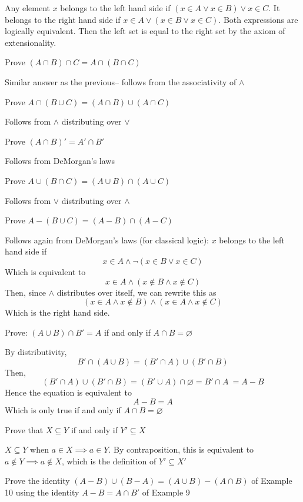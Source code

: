 \answer 
Any element $x$ belongs to the left hand side if $(x \in A \vee x \in B) \vee x \in C$. It belongs to the right hand side if $x \in A \vee (x \in B \vee x \in C)$. Both expressions are logically equivalent. Then the left set is equal to the right set by the axiom of extensionality.


\exercise
Prove $(A \cap B) \cap C = A \cap (B \cap C)$

\answer 
Similar answer as the previous-- follows from the associativity of $\wedge$


\exercise
Prove $A \cap (B \cup C) = (A \cap B) \cup (A \cap C)$

\answer
Follows from $\wedge$ distributing over $\vee$


\exercise
Prove $(A \cap B)' = A' \cap B'$

\answer
Follows from DeMorgan's laws


\exercise
Prove $A \cup (B \cap C) = (A \cup B) \cap (A \cup C)$

\answer
Follows from $\vee$ distributing over $\wedge$


\exercise
Prove $A - (B \cup C) = (A - B) \cap (A - C)$

\answer
Follows again from DeMorgan's laws (for classical logic): $x$ belongs to the left hand side if
\[x \in A \wedge \neg(x \in B \vee x \in C)\] 
Which is equivalent to 
\[x \in A \wedge (x \notin B \wedge x \notin C)\] 
Then, since $\wedge$ distributes over itself, we can rewrite this as
\[(x \in A \wedge x \notin B) \wedge (x \in A \wedge x \notin C)\] 
Which is the right hand side.


\exercise
Prove: $(A \cup B) \cap B' = A$ if and only if $A \cap B = \varnothing$

\answer
By distributivity,
\[B' \cap (A \cup B) = (B' \cap A) \cup (B' \cap B)\]
Then,
\[(B' \cap A) \cup (B' \cap B) = (B' \cup A) \cap \varnothing = B' \cap A\ = A - B\]
Hence the equation is equivalent to 
\[A- B = A\]
Which is only true if and only if $A \cap B = \varnothing$


\exercise
Prove that $X \subseteq Y$ if and only if $Y' \subseteq X$

\answer
$X \subseteq Y$ when $a \in X \implies a \in Y$. By contraposition, this is equivalent to $a \notin Y \implies a \notin X$, which is the definition of $Y' \subseteq X'$


\exercise
Prove the identity $(A - B) \cup (B- A) = (A \cup B) - (A \cap B)$ of Example 10 using the identity $A - B = A \cap B'$ of Example 9

